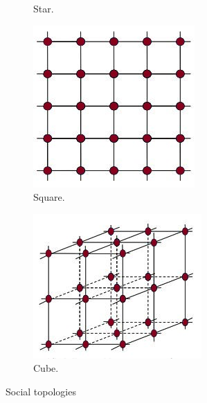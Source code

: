 \begin{figure}[H]
\begin{subfigure}[b]{0.23\textwidth}
    \caption{Star.}
    \label{fig:startopology}
  \end{subfigure}
  \hfill
  \begin{subfigure}[b]{0.23\textwidth}
    \includegraphics[width=\textwidth]{Part 2 - Search-Based Optimization/Particle Swarm Optimization/Images/SQUARE.jpg}
    \caption{Square.}
    \label{fig:squaretopology}
  \end{subfigure}
  \hfill
  \begin{subfigure}[b]{0.23\textwidth}
    \includegraphics[width=\textwidth]{Part 2 - Search-Based Optimization/Particle Swarm Optimization/Images/CUBE.jpg}
    \caption{Cube.}
    \label{fig:cubetopology}
  \end{subfigure}
\caption{Social topologies}
  \label{fig:topologies}
\end{figure}

